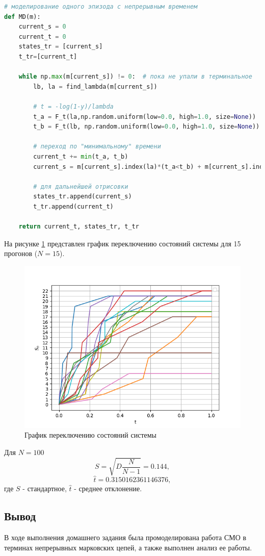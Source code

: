 \begin{lstlisting}[language=python, label=prog,caption={\textit{реализация марковского процесса}}]
# моделирование одного эпизода с непрерывным временем
def MD(m):
    current_s = 0
    current_t = 0
    states_tr = [current_s]
    t_tr=[current_t]

    while np.max(m[current_s]) != 0:  # пока не упали в терминальное
        lb, la = find_lambda(m[current_s])

        # t = -log(1-y)/lambda
        t_a = F_t(la,np.random.uniform(low=0.0, high=1.0, size=None))
        t_b = F_t(lb, np.random.uniform(low=0.0, high=1.0, size=None))

        # переход по "минимальному" времени
        current_t += min(t_a, t_b)
        current_s = m[current_s].index(la)*(t_a<t_b) + m[current_s].index(lb)*(t_a>=t_b)

        # для дальнейшей отрисовки
        states_tr.append(current_s)
        t_tr.append(current_t)

    return current_t, states_tr, t_tr
\end{lstlisting}

На рисунке \ref{MDP} представлен график переключению состояний системы для 15 прогонов ($N=15$).
\begin{figure}[H]
\centerline{\includegraphics[scale = .8]{Images/term.png}}
\caption{График переключению состояний системы}
\label{MDP}
\end{figure}

Для $N=100$
$$S=\sqrt{D\frac{N}{N-1}}= 0.144,$$
$$\hat{t}=0.3150162361146376,$$
где $S$ - стандартное, $\hat{t}$ - среднее отклонение.

\subsection{Вывод}
В ходе выполнения домашнего задания была промоделирована работа СМО в терминах непрерывных марковских цепей,
а также выполнен анализ ее работы.

